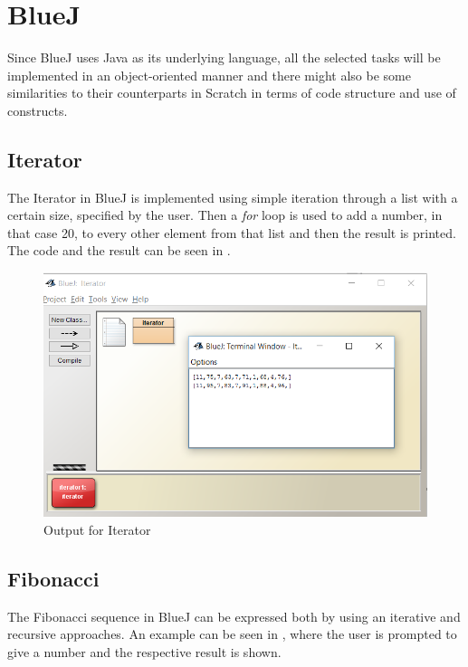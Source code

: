 \section{BlueJ}
\label{sec:bluej}
Since BlueJ uses Java as its underlying language, all the selected tasks will be implemented in an object-oriented manner and there might also be some similarities to their counterparts in Scratch in terms of code structure and use of constructs.
\subsection{Iterator}
The Iterator in BlueJ is implemented using simple iteration through a list with a certain size, specified by the user. Then a \textit{for} loop is used to add a number, in that case 20, to every other element from that list and then the result is printed. The code and the result can be seen in . %

\begin{figure}[!h]
  \centering
      \includegraphics[scale=0.7]{./pics/bluej_iterator_code}
      \caption{Output for Iterator}
      \label{fig:bluej_iterator_code} 
\end{figure}

\subsection{Fibonacci}
The Fibonacci sequence in BlueJ can be expressed both by using an iterative and recursive approaches. An example can be seen in , where the user is prompted to give a number and the respective result is shown.

